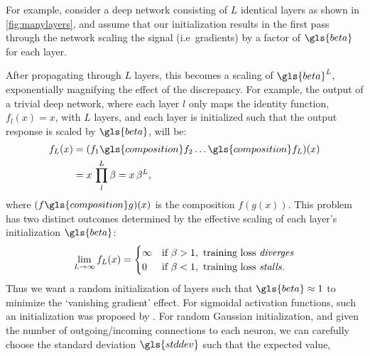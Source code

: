 \documentclass[thesis]{subfiles}
\begin{document}
For example, consider a deep network consisting of $L$ identical layers as shown in \cref{fig:manylayers}, and assume that our initialization results in the first pass through the network scaling the signal (i.e~gradients) by a factor of $\gls{beta}$ for each layer.

After propagating through $L$ layers, this becomes a scaling of $\gls{beta}^L$, exponentially magnifying the effect of the discrepancy. For example, the output of a trivial deep network, where each layer $l$ only maps the identity function, $f_{l}(x) = x$, with $L$ layers, and each layer is initialized such that the output response is scaled by $\gls{beta}$, will be:
%
\begin{equation}
\begin{aligned}
	f_L(x) & = (f_1 \gls{composition} f_2 \ldots \gls{composition} f_L) (x)\\
	& = x \, \prod^{L}_{l} \beta = x\, \beta^L,
\end{aligned}
\end{equation}
where $(f \gls{composition} g)(x)$ is the composition $f(g(x))$.
%
This problem has two distinct outcomes determined by the effective scaling of each layer's initialization $\gls{beta}$:
\[
\lim_{L\to\infty} f_L(x) = 
\begin{cases}
\infty & \text{if } \beta > 1, \text{ training loss \emph{diverges}}\\
0 & \text{if } \beta < 1, \text{ training loss \emph{stalls}}.
\end{cases}
\]
%
Thus we want a random initialization of layers such that $\gls{beta}\approx 1$ to minimize the `vanishing gradient' effect. For sigmoidal activation functions, such an initialization was proposed by \citet{glorot2010understanding}. For random Gaussian initialization, and given the number of outgoing/incoming connections to each neuron, we can carefully choose the standard deviation $\gls{stddev}$ such that the expected value,
\end{document}
